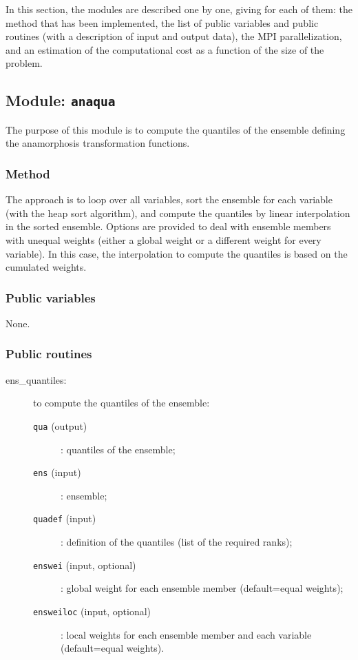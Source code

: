 \documentclass[11pt]{article}
\begin{document}
In this section,
the modules are described one by one,
giving for each of them:
the method that has been implemented,
the list of public variables and public routines
(with a description of input and output data),
the MPI parallelization, and
an estimation of the computational cost
as a function of the size of the problem.

\subsection{Module: {\tt\bf anaqua}}

The purpose of this module is to compute the quantiles of the ensemble
defining the anamorphosis transformation functions.

\subsubsection*{Method}

The approach is to loop over all variables,
sort the ensemble for each variable (with the heap sort algorithm), and
compute the quantiles by linear interpolation in the sorted ensemble.
Options are provided to deal with ensemble members with unequal weights
(either a global weight or a different weight for every variable).
In this case, the interpolation to compute the quantiles
is based on the cumulated weights.

\subsubsection*{Public variables}

None.

\subsubsection*{Public routines}

\begin{description}
\item[ens\_quantiles:] to compute the quantiles of the ensemble:
  \begin{description}
  \item[{\tt qua} (output)]: quantiles of the ensemble;
  \item[{\tt ens} (input)]: ensemble;
  \item[{\tt quadef} (input)]: definition of the quantiles (list of the required ranks);
  \item[{\tt enswei} (input, optional)]: global weight for each ensemble member (default=equal weights);
  \item[{\tt ensweiloc} (input, optional)]: local weights for each ensemble member and each variable (default=equal weights).
  \end{description}
\end{description}
\end{document}

